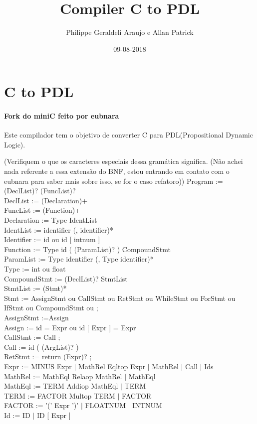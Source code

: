 \documentclass{article}
\title{Compiler C to PDL}
\date{09-08-2018}
\author{Philippe Geraldeli Araujo e Allan Patrick}
\newcommand\bruno[1]{({\color{red}#1})}
\newcommand\philippe[1]{({\color{blue}#1})}
\begin{document}
	
	\maketitle
	\newpage
	
	\section{C to PDL}
	
	\paragraph{Fork do miniC feito por eubnara\\}
	Este compilador tem o objetivo de converter C para PDL(Propositional Dynamic Logic). \vspace{10mm}
	
	\small \bruno{Verifiquem o que os caracteres especiais dessa gramática significa.	\philippe{Não achei nada referente a essa extensão do BNF, estou entrando em contato com o eubnara para saber mais sobre isso, se for o caso refatoro}} 
	\noindent
	Program := (DeclList)? (FuncList)?   \\
	DeclList := (Declaration)+          \\
	FuncList := (Function)+ \\ 
	Declaration := Type IdentList \\
	IdentList := identifier (, identifier)* \\
	Identifier := id ou id [ intnum ]       \\
	Function := Type id ( (ParamList)? ) CompoundStmt \\
	ParamList := Type identifier (, Type identifier)* \\
	Type := int ou float \\
	CompoundStmt := { (DeclList)? StmtList } \\
	StmtList := (Stmt)* \\
	Stmt := AssignStmt ou CallStmt ou RetStmt ou WhileStmt ou ForStmt ou IfStmt ou CompoundStmt ou ; \\
	AssignStmt :=Assign  \\
	Assign := id = Expr ou id [ Expr ] = Expr \\
	CallStmt := Call ; \\
	Call := id ( (ArgList)? ) \\
	RetStmt := return (Expr)? ;  \\
	Expr := MINUS Expr $|$ MathRel Eqltop Expr $|$ MathRel $|$ Call $|$ Ids \\
	MathRel := MathEql Relaop MathRel $|$ MathEql \\
	MathEql := TERM Addiop MathEql $|$ TERM \\
	TERM := FACTOR Multop TERM $|$ FACTOR \\
	FACTOR := '(' Expr ')' $|$ FLOATNUM $|$ INTNUM \\
	Id := ID $|$ ID [ Expr ] \\
	
\end{document}
